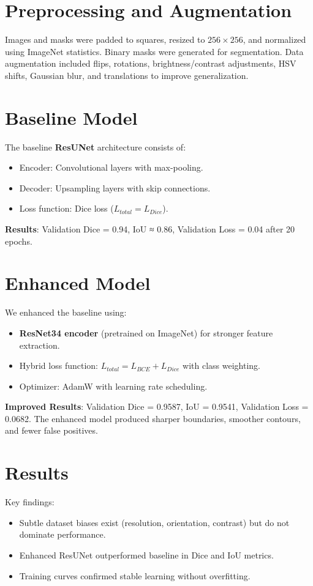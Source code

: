 \documentclass[12pt,a4paper]{article}
\begin{document}
\section{Preprocessing and Augmentation}
Images and masks were padded to squares, resized to \(256 \times 256\), and normalized using ImageNet statistics. Binary masks were generated for segmentation. Data augmentation included flips, rotations, brightness/contrast adjustments, HSV shifts, Gaussian blur, and translations to improve generalization.

\section{Baseline Model}
The baseline \textbf{ResUNet} architecture consists of:
\begin{itemize}
    \item Encoder: Convolutional layers with max-pooling.
    \item Decoder: Upsampling layers with skip connections.
    \item Loss function: Dice loss (\(L_{total}=L_{Dice}\)).
\end{itemize}
\textbf{Results}: Validation Dice = 0.94, IoU ≈ 0.86, Validation Loss = 0.04 after 20 epochs.

\section{Enhanced Model}
We enhanced the baseline using:
\begin{itemize}
    \item \textbf{ResNet34 encoder} (pretrained on ImageNet) for stronger feature extraction.
    \item Hybrid loss function: \(L_{total}=L_{BCE}+L_{Dice}\) with class weighting.
    \item Optimizer: AdamW with learning rate scheduling.
\end{itemize}
\textbf{Improved Results}: Validation Dice = 0.9587, IoU = 0.9541, Validation Loss = 0.0682. The enhanced model produced sharper boundaries, smoother contours, and fewer false positives.

\section{Results}
Key findings:
\begin{itemize}
    \item Subtle dataset biases exist (resolution, orientation, contrast) but do not dominate performance.
    \item Enhanced ResUNet outperformed baseline in Dice and IoU metrics.
    \item Training curves confirmed stable learning without overfitting.
\end{itemize}
\end{document}
